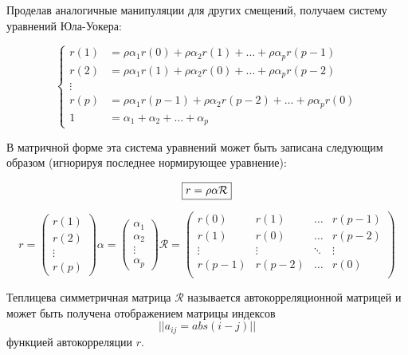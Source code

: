 Проделав аналогичные манипуляции для других смещений, получаем систему уравнений
Юла-Уокера:

\begin{equation}
\left\{
\begin{aligned}
    r(1) &= \rho\alpha_1 r(0) + \rho\alpha_2 r(1) + \dots + \rho\alpha_p r(p - 1)\\
    r(2) &= \rho\alpha_1 r(1) + \rho\alpha_2 r(0) + \dots + \rho\alpha_p r(p - 2)\\
    \vdots\\
    r(p) &= \rho\alpha_1 r(p - 1) + \rho\alpha_2 r(p - 2) + \dots + \rho\alpha_p r(0)\\
    1    &= \alpha_1 + \alpha_2 + \dots + \alpha_p
\end{aligned}
\right.
\label{eq:system}
\end{equation}

В матричной форме эта система уравнений может быть записана следующим образом
(игнорируя последнее нормирующее уравнение):

\begin{equation}
        \boxed{%
        r = \rho\alpha \mathcal{R} }
\end{equation}

\begin{equation}
r = \begin{pmatrix} r(1)\\r(2)\\\vdots\\r(p) \end{pmatrix}
    \alpha = \begin{pmatrix} \alpha_1 \\ \alpha_2 \\ \vdots \\ \alpha_p \end{pmatrix}
        \mathcal{R} = \begin{pmatrix}
            r(0) & r(1) & \dots & r(p-1) \\
            r(1) & r(0) & \dots & r(p-2) \\
            \vdots & \vdots & \ddots & \vdots \\
            r(p-1) & r(p-2) & \dots & r(0) \\
        \end{pmatrix}
\end{equation}

Теплицева симметричная матрица $\mathcal{R}$ называется автокорреляционной
матрицей и может быть получена отображением матрицы индексов $$|| a_{ij} = abs(i - j) ||$$
функцией автокорреляции $r$.

